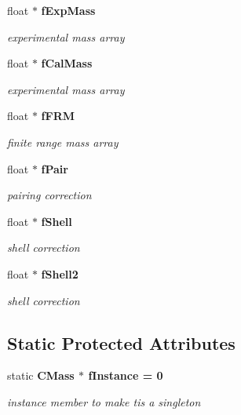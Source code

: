 \begin{CompactItemize}
\item 
float $\ast$ \bf{f\-Exp\-Mass}\label{classCMass_94b681f2a0949f6e3abbcb1872e3569a}

\begin{CompactList}\small\item\em experimental mass array \item\end{CompactList}\item 
float $\ast$ \bf{f\-Cal\-Mass}\label{classCMass_d1d4e9cfdd75aa6a361ab4131a9e3250}

\begin{CompactList}\small\item\em experimental mass array \item\end{CompactList}\item 
float $\ast$ \bf{f\-FRM}\label{classCMass_b664f2eba3bb5973a5f3a41c5a929f94}

\begin{CompactList}\small\item\em finite range mass array \item\end{CompactList}\item 
float $\ast$ \bf{f\-Pair}\label{classCMass_74d98a8a5a4a1cbdc1532aaf5408c026}

\begin{CompactList}\small\item\em pairing correction \item\end{CompactList}\item 
float $\ast$ \bf{f\-Shell}\label{classCMass_b22cbf6a40128e4aa1460b9469e1ab8b}

\begin{CompactList}\small\item\em shell correction \item\end{CompactList}\item 
float $\ast$ \bf{f\-Shell2}\label{classCMass_32b6d3dcb143489ed987450bd243fd83}

\begin{CompactList}\small\item\em shell correction \item\end{CompactList}\end{CompactItemize}
\subsection*{Static Protected Attributes}
\begin{CompactItemize}
\item 
static \bf{CMass} $\ast$ \bf{f\-Instance} = 0\label{classCMass_a92566988e892bcfc9a17bb20e55f32c}

\begin{CompactList}\small\item\em instance member to make tis a singleton \item\end{CompactList}\end{CompactItemize}


